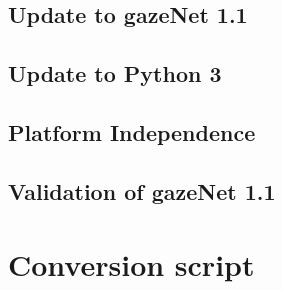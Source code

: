 \documentclass{article}
\begin{document}
\subsection{Update to gazeNet 1.1}
\subsection{Update to Python 3}

\subsection{Platform Independence}

\subsection{Validation of gazeNet 1.1}

\section{Conversion script}



\end{document}
